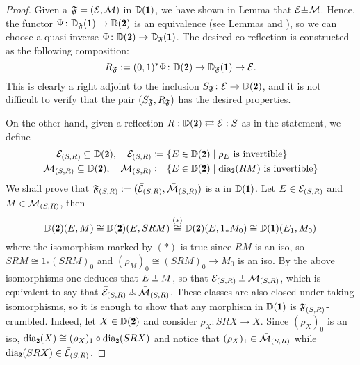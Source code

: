 \begin{proof}
Given a \hfs $\mathfrak{F}=( \mathcal{E}, \mathcal{M})$ in $\D(\uno)$, we have shown in Lemma  that $\E{\corth}\M$. Hence, the functor $\Psi\colon \D_{\F}(\uno)\to \D(\due)$ is an equivalence (see Lemmas  and ), so we can choose a quasi-inverse $\Phi\colon \D(\due)\to \D_\F(\uno)$. The desired co-reflection is constructed as the following composition:
\[
R_\F:=(0,1)^*\Phi\colon \D(\due)\to \D_\F(\uno)\to \E.
\]
This is clearly a right adjoint to the inclusion $S_\F\colon \E\to \D(\due)$, and it is not difficult to verify that the pair $(S_{\mathfrak{F}},R_{\mathfrak{F}})$ has the desired properties. 

On the other hand, given a reflection $R: \D(\due)\rightleftarrows\E :S$ as in the statement, we define 
\begin{align*}
\E_{(S,R)}\subseteq \D(\due), \quad \E_{(S,R)}&\coloneqq \{E\in \D(\due) \mid \rho_E \text{ is invertible}\}\\
\M_{(S,R)}\subseteq \D(\due), \quad \M_{(S,R)}&\coloneqq \{E\in \D(\due) \mid \dia_\due(RM) \text{ is invertible}\}
\end{align*}
We shall prove that $\mathfrak{F}_{(S,R)}:=(\bar{\mathcal{E}}_{(S,R)},\bar{\mathcal{M}}_{(S,R)})$ is a \hfs in $\D(\uno)$. 
Let $E\in \mathcal{E}_{(S,R)}$ and $M\in \mathcal{M}_{(S,R)}$, then
\[
\D(\due)(E,M)\cong \D(\due)(E,SRM)\overset{(*)}{\cong} \D(\due)(E,1_*M_0)\cong \D(\uno)(E_1,M_0)
\]
where the isomorphism marked by $(*)$ is true since $RM$ is an iso, so $SRM\cong 1_*(SRM)_0$ and $(\rho_M)_0\cong(SRM)_0\to M_0$ is an iso. By the above isomorphisms one deduces that $E\corth M$, so that $\E_{(S,R)}\corth \M_{(S,R)}$, which is equivalent to say that $\bar \E_{(S,R)}\horth \bar \M_{(S,R)}$. These classes are also closed under taking isomorphisms, so it is enough to show that any morphism in $\D(\uno)$ is  $\mathfrak{F}_{(S,R)}$-crumbled. Indeed, let $X\in \D(\due)$ and consider $\rho_X\colon SRX\to X$. Since $(\rho_X)_0$ is an iso, $\dia_\due(X)\cong (\rho_X)_1\circ \dia_\due(SRX)$ and notice that $(\rho_X)_1\in \bar{\mathcal{M}}_{(S,R)}$ while $\dia_\due(SRX)\in \bar\E_{(S,R)}$.


\end{proof}
